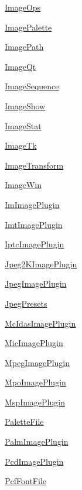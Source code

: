\begin{DoxyCompactItemize}
 \hyperlink{namespacePIL_1_1ImageOps}{Image\+Ops}
\item 
 \hyperlink{namespacePIL_1_1ImagePalette}{Image\+Palette}
\item 
 \hyperlink{namespacePIL_1_1ImagePath}{Image\+Path}
\item 
 \hyperlink{namespacePIL_1_1ImageQt}{Image\+Qt}
\item 
 \hyperlink{namespacePIL_1_1ImageSequence}{Image\+Sequence}
\item 
 \hyperlink{namespacePIL_1_1ImageShow}{Image\+Show}
\item 
 \hyperlink{namespacePIL_1_1ImageStat}{Image\+Stat}
\item 
 \hyperlink{namespacePIL_1_1ImageTk}{Image\+Tk}
\item 
 \hyperlink{namespacePIL_1_1ImageTransform}{Image\+Transform}
\item 
 \hyperlink{namespacePIL_1_1ImageWin}{Image\+Win}
\item 
 \hyperlink{namespacePIL_1_1ImImagePlugin}{Im\+Image\+Plugin}
\item 
 \hyperlink{namespacePIL_1_1ImtImagePlugin}{Imt\+Image\+Plugin}
\item 
 \hyperlink{namespacePIL_1_1IptcImagePlugin}{Iptc\+Image\+Plugin}
\item 
 \hyperlink{namespacePIL_1_1Jpeg2KImagePlugin}{Jpeg2\+K\+Image\+Plugin}
\item 
 \hyperlink{namespacePIL_1_1JpegImagePlugin}{Jpeg\+Image\+Plugin}
\item 
 \hyperlink{namespacePIL_1_1JpegPresets}{Jpeg\+Presets}
\item 
 \hyperlink{namespacePIL_1_1McIdasImagePlugin}{Mc\+Idas\+Image\+Plugin}
\item 
 \hyperlink{namespacePIL_1_1MicImagePlugin}{Mic\+Image\+Plugin}
\item 
 \hyperlink{namespacePIL_1_1MpegImagePlugin}{Mpeg\+Image\+Plugin}
\item 
 \hyperlink{namespacePIL_1_1MpoImagePlugin}{Mpo\+Image\+Plugin}
\item 
 \hyperlink{namespacePIL_1_1MspImagePlugin}{Msp\+Image\+Plugin}
\item 
 \hyperlink{namespacePIL_1_1PaletteFile}{Palette\+File}
\item 
 \hyperlink{namespacePIL_1_1PalmImagePlugin}{Palm\+Image\+Plugin}
\item 
 \hyperlink{namespacePIL_1_1PcdImagePlugin}{Pcd\+Image\+Plugin}
\item 
 \hyperlink{namespacePIL_1_1PcfFontFile}{Pcf\+Font\+File}

\end{DoxyCompactItemize}
